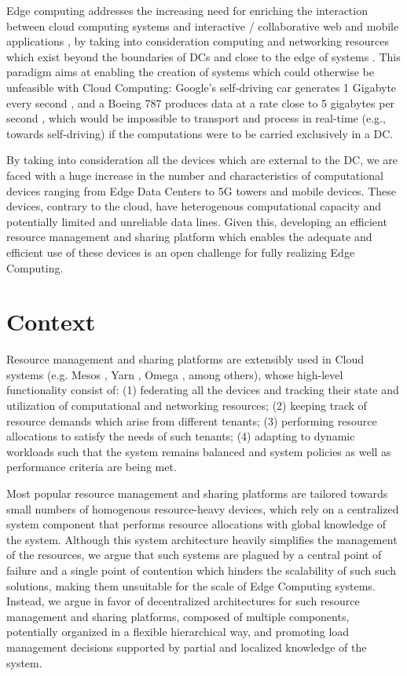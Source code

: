 Edge computing addresses the increasing need for enriching the interaction between cloud computing systems and interactive / collaborative web and mobile applications \cite{10.1145/242857.242867}, by taking into consideration  computing and networking resources which exist beyond the boundaries of DCs and close to the edge of systems \cite{Leitao2018} \cite{7488250}. This paradigm aims at enabling the creation of systems which could otherwise be unfeasible with Cloud Computing: Google's self-driving car generates 1 Gigabyte every second \cite{datafloq}, and a Boeing 787 produces data at a rate close to 5 gigabytes per second \cite{finnegan_2013}, which would be impossible to transport and process in real-time (e.g., towards self-driving) if the computations were to be carried exclusively in a DC.

By taking into consideration all the devices which are external to the DC, we are faced with a huge increase in the number and characteristics of computational devices ranging from Edge Data Centers to 5G towers and mobile devices. These devices, contrary to the cloud, have heterogenous computational capacity and potentially limited and unreliable data lines. Given this, developing an efficient resource management and sharing platform which enables the adequate and efficient use of these devices is an open challenge for fully realizing Edge Computing.


\section{Context}

Resource management and sharing platforms are extensibly used in Cloud systems (e.g. Mesos \cite{hindman2011mesos}, Yarn \cite{Vavilapalli2013ApacheHY}, Omega \cite{41684}, among others), whose high-level functionality consist of: (1) federating all the devices and tracking their state and utilization of computational and networking resources; (2) keeping track of resource demands which arise from different tenants; (3) performing resource allocations to satisfy the needs of such tenants; (4) adapting to dynamic workloads such that the system remains balanced and system policies as well as performance criteria are being met.

Most popular resource management and sharing platforms are tailored towards small numbers of homogenous resource-heavy devices, which rely on a centralized system component that performs resource allocations with global knowledge of the system. Although this system architecture heavily simplifies the management of the resources, we argue that such systems are plagued by a central point of failure and a single point of contention which hinders the scalability of such such solutions, making them unsuitable for the scale of Edge Computing systems. Instead, we argue in favor of decentralized architectures for such resource management and sharing platforms, composed of multiple components, potentially organized in a flexible hierarchical way, and promoting load management decisions supported by partial and localized knowledge of the system.


